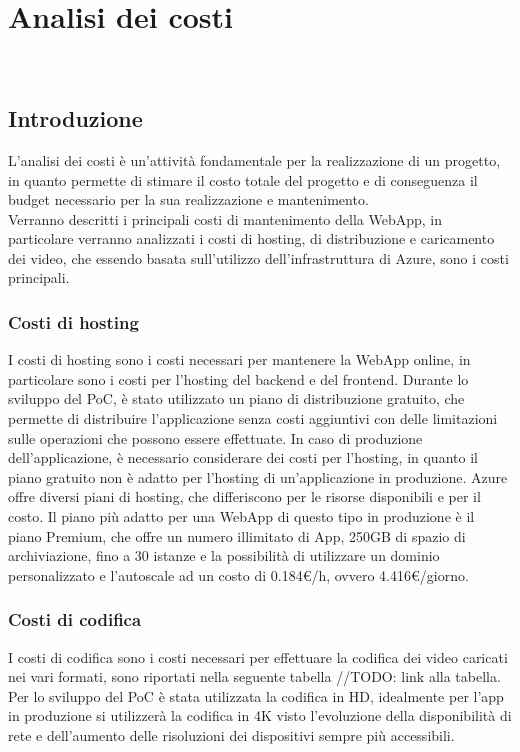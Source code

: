 \chapter{Analisi dei costi}
\label{cap:analisi-costi}
\\

\section{Introduzione}
\label{sec:introduzione}
L'analisi dei costi è un'attività fondamentale per la realizzazione di un progetto, in quanto permette di stimare il costo totale del progetto e di conseguenza il budget necessario per la sua realizzazione e mantenimento.\\
Verranno descritti i principali costi di mantenimento della WebApp, in particolare verranno analizzati i costi di hosting, di distribuzione e caricamento dei video, che essendo basata sull'utilizzo dell'infrastruttura di Azure, sono i costi principali.\\

\subsection{Costi di hosting}
\label{subsec:costi-hosting}
I costi di hosting sono i costi necessari per mantenere la WebApp online, in particolare sono i costi per l'hosting del backend e del frontend. Durante lo sviluppo del PoC, è stato utilizzato un piano di distribuzione gratuito, che permette di distribuire l'applicazione senza costi aggiuntivi con delle limitazioni sulle operazioni che possono essere effettuate. In caso di produzione dell'applicazione, è necessario considerare dei costi per l'hosting, in quanto il piano gratuito non è adatto per l'hosting di un'applicazione in produzione. Azure offre diversi piani di hosting, che differiscono per le risorse disponibili e per il costo. Il piano più adatto per una WebApp di questo tipo in produzione è il piano Premium, che offre un numero illimitato di App, 250GB di spazio di archiviazione, fino a 30 istanze e la possibilità di utilizzare un dominio personalizzato e l'autoscale ad un costo di 0.184€/h, ovvero 4.416€/giorno.\\
\subsection{Costi di codifica}
I costi di codifica sono i costi necessari per effettuare la codifica dei video caricati nei vari formati, sono riportati nella seguente tabella //TODO: link alla tabella.
Per lo sviluppo del PoC è stata utilizzata la codifica in HD, idealmente per l'app in produzione si utilizzerà la codifica in 4K visto l'evoluzione della disponibilità di rete e dell'aumento delle risoluzioni dei dispositivi sempre più accessibili.


